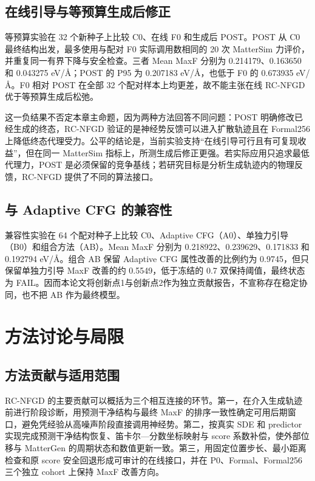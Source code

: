 \subsection{在线引导与等预算生成后修正}

等预算实验在 32 个新种子上比较 C0、在线 F0 和生成后 POST。POST 从 C0 最终结构出发，最多使用与配对 F0 实际调用数相同的 20 次 Matter\allowbreak Sim 力评价，并重复同一有界下降与安全检查。三者 Mean MaxF 分别为 0.214179、0.163650 和 0.043275 eV/Å；POST 的 P95 为 0.207183 eV/Å，也低于 F0 的 0.673935 eV/Å。F0 相对 POST 在全部 32 个配对样本上均更差，故不能主张在线 RC-NFGD 优于等预算生成后松弛。

这一负结果不否定本章主命题，因为两种方法回答不同问题：POST 明确修改已经生成的终态，RC-NFGD 验证的是神经势反馈可以进入扩散轨迹且在 Formal256 上降低终态代理受力。公平的结论是，当前实验支持``在线引导可行且有可复现收益''，但在同一 Matter\allowbreak Sim 指标上，所测生成后修正更强。若实际应用只追求最低代理力，POST 是必须保留的竞争基线；若研究目标是分析生成轨迹内的物理反馈，RC-NFGD 提供了不同的算法接口。

\subsection{与 Adaptive CFG 的兼容性}

兼容性实验在 64 个配对种子上比较 C0、Adaptive CFG（A0）、单独力引导（B0）和组合方法（AB）。Mean MaxF 分别为 0.218922、0.239629、0.171833 和 0.192794 eV/Å。组合 AB 保留 Adaptive CFG 属性改善的比例约为 0.9745，但只保留单独力引导 MaxF 改善的约 0.5549，低于冻结的 0.7 双保持阈值，最终状态为 FAIL。因而本论文将创新点1与创新点2作为独立贡献报告，不宣称存在稳定协同，也不把 AB 作为最终模型。

\section{方法讨论与局限}

\subsection{方法贡献与适用范围}

RC-NFGD 的主要贡献可以概括为三个相互连接的环节。第一，在介入生成轨迹前进行阶段诊断，用预测干净结构与最终 MaxF 的排序一致性确定可用后期窗口，避免凭经验从高噪声阶段直接调用神经势。第二，按真实 SDE 和 predictor 实现完成预测干净结构恢复、笛卡尔---分数坐标映射与 score 系数补偿，使外部位移与 MatterGen 的周期状态和数值更新一致。第三，用固定位置步长、最小距离检查和原 score 安全回退形成可审计的在线接口，并在 P0、Formal、Formal256 三个独立 cohort 上保持 MaxF 改善方向。

